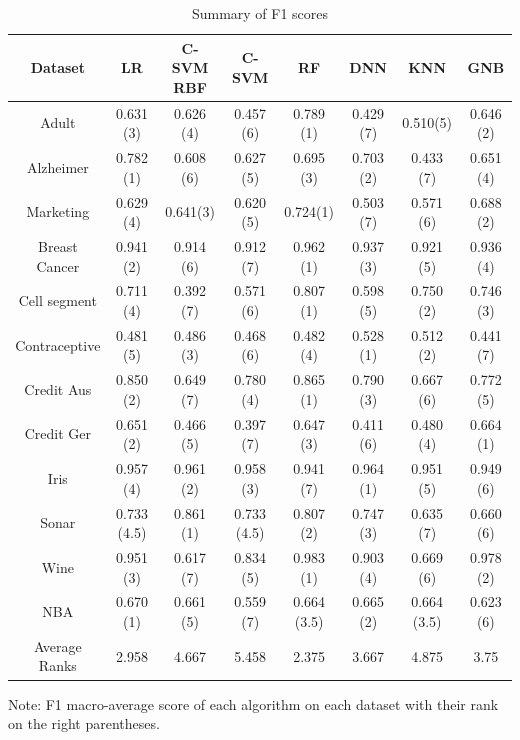 \documentclass[a4paper,12pt]{article}
\numberwithin{equation}{section}
\begin{document}
\begin{appendices}
\begin{table}[H]
\begin{center}
\caption{Summary of F1 scores}
\begin{threeparttable}
\begin{tabular}{ |c|c|c|c|c|c|c|c| } 
 \hline
 Dataset & LR & C-SVM RBF & C-SVM & RF & DNN & KNN & GNB \\ 
 \hline 
 Adult & 0.631 (3) & 0.626 (4) & 0.457 (6)& 0.789 (1) & 0.429 (7) & 0.510(5) & 0.646 (2)\\[1pt]
 Alzheimer & 0.782 (1) & 0.608 (6) & 0.627 (5) & 0.695 (3) & 0.703 (2)& 0.433 (7)& 0.651 (4) \\[1pt]
 Marketing & 0.629 (4) & 0.641(3) & 0.620 (5) & 0.724(1) & 0.503 (7) & 0.571 (6)& 0.688 (2)\\[1pt]
 Breast Cancer & 0.941 (2)& 0.914 (6) & 0.912 (7) & 0.962 (1) & 0.937 (3) & 0.921 (5) & 0.936 (4)\\[1pt]
 Cell segment & 0.711 (4) & 0.392 (7) & 0.571 (6) & 0.807 (1) & 0.598 (5)& 0.750 (2)& 0.746 (3) \\[1pt]
 Contraceptive & 0.481 (5) & 0.486 (3) & 0.468 (6) & 0.482 (4) & 0.528 (1) & 0.512 (2) & 0.441 (7) \\[1pt]
 Credit Aus & 0.850 (2) & 0.649 (7) & 0.780 (4) & 0.865 (1) & 0.790 (3) & 0.667 (6) & 0.772 (5) \\[1pt]
 Credit Ger & 0.651 (2) & 0.466 (5) & 0.397 (7) & 0.647 (3) & 0.411 (6) & 0.480 (4) & 0.664 (1)\\[1pt]
 Iris & 0.957 (4) & 0.961 (2) & 0.958 (3) & 0.941 (7) & 0.964 (1) & 0.951 (5) & 0.949 (6) \\[1pt]
 Sonar & 0.733 (4.5) & 0.861 (1) & 0.733 (4.5) & 0.807 (2) & 0.747 (3) & 0.635 (7) & 0.660 (6) \\[1pt]
 Wine & 0.951 (3) & 0.617 (7) & 0.834 (5) & 0.983 (1) & 0.903 (4) & 0.669 (6) & 0.978 (2) \\[1pt]
 NBA  & 0.670 (1) & 0.661 (5) & 0.559 (7) & 0.664 (3.5) & 0.665 (2) & 0.664 (3.5) & 0.623 (6) \\[1pt]
 \hline
 Average Ranks & 2.958  & 4.667 & 5.458 & 2.375 & 3.667 & 4.875 & 3.75 \\
 \hline

\end{tabular}
\begin{tablenotes}
\small
\item   Note: F1 macro-average score of each algorithm on each dataset with their rank on the right parentheses.
\end{tablenotes}
\end{threeparttable}
\label{table:9}
\end{center}
\end{table}


\end{appendices}
\end{document}
